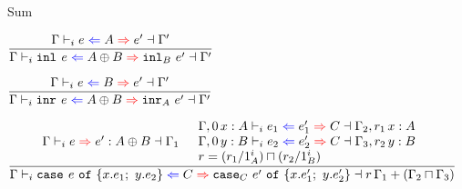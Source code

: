 \documentclass{beamer}
\begin{document}
\begin{frame}{Sum}

\begin{center}
  $\infrule{\checkelab{\Gamma}{e}{A}{e'}{\Gamma'}}{\checkelab{\Gamma}{\inl{e}}{\Sum{A}{B}}{\inl[B]{e'}}{\Gamma'}}$

  \vspace{1em}

  $\infrule{\checkelab{\Gamma}{e}{B}{e'}{\Gamma'}}{\checkelab{\Gamma}{\inr{e}}{\Sum{A}{B}}{\inr[A]{e'}}{\Gamma'}}$

  \vspace{2em}

  $\infrule{\inferelab{\Gamma}{e}{e'}{\Sum{A}{B}}{\Gamma_1} \quad \begin{array}{l} \checkelab{\extend{\Gamma}[\Zero]{x}{A}}{e_1}{e_1'}{C}{\extend{\Gamma_2}[r_1]{x}{A}} \\ \checkelab{\extend{\Gamma}[\Zero]{y}{B}}{e_2}{e_2'}{C}{\extend{\Gamma_3}[r_2]{y}{B}} \\ r = \glbqty{(\divqty{r_1}{\totalqty{\One}{A}})}{(\divqty{r_2}{\totalqty{\One}{B}})} \end{array}}{\checkelab{\Gamma}{\newcase{e}{x}{e_1}{y}{e_2}}{C}{\newcase{e'}{x}{e_1'}{y}{e_2'}[C]}{\addctx{\scalectx{r}{\Gamma_1}}{(\glbctx{\Gamma_2}{\Gamma_3})}}}$
\end{center}

\end{frame}
\end{document}
